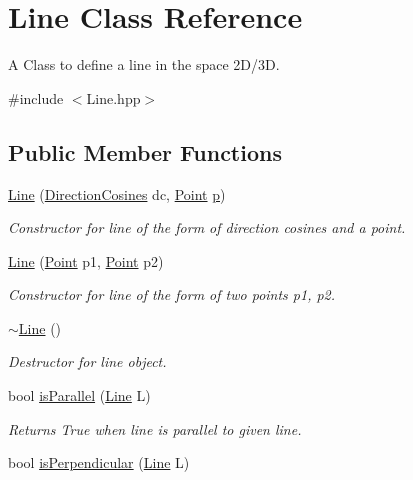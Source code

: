 \hypertarget{class_line}{}\section{Line Class Reference}
\label{class_line}


A Class to define a line in the space 2\+D/3D.  




{\ttfamily \#include $<$Line.\+hpp$>$}

\subsection*{Public Member Functions}
\begin{DoxyCompactItemize}
\item 
\mbox{\hyperlink{class_line_ae24f583f6e61000f88a20205e9b7cf1c}{Line}} (\mbox{\hyperlink{class_direction_cosines}{Direction\+Cosines}} dc, \mbox{\hyperlink{class_point}{Point}} \mbox{\hyperlink{class_line_ade526d53a83ae2cfad4472affeb9ce8d}{p}})
\begin{DoxyCompactList}\small\item\em Constructor for line of the form of direction cosines and a point. \end{DoxyCompactList}\item 
\mbox{\hyperlink{class_line_afeaa676c7d249d582c5766dc732a78e2}{Line}} (\mbox{\hyperlink{class_point}{Point}} p1, \mbox{\hyperlink{class_point}{Point}} p2)
\begin{DoxyCompactList}\small\item\em Constructor for line of the form of two points p1, p2. \end{DoxyCompactList}\item 
\mbox{\hyperlink{class_line_aabe85f48d22d92b62257091f48174fac}{$\sim$\+Line}} ()
\begin{DoxyCompactList}\small\item\em Destructor for line object. \end{DoxyCompactList}\item 
bool \mbox{\hyperlink{class_line_a8059ce73fc21fafe0ea87939d7d20895}{is\+Parallel}} (\mbox{\hyperlink{class_line}{Line}} L)
\begin{DoxyCompactList}\small\item\em Returns True when line is parallel to given line. \end{DoxyCompactList}\item 
bool \mbox{\hyperlink{class_line_adf08ea54b857c27d783321a3e6858222}{is\+Perpendicular}} (\mbox{\hyperlink{class_line}{Line}} L)

\end{DoxyCompactItemize}
